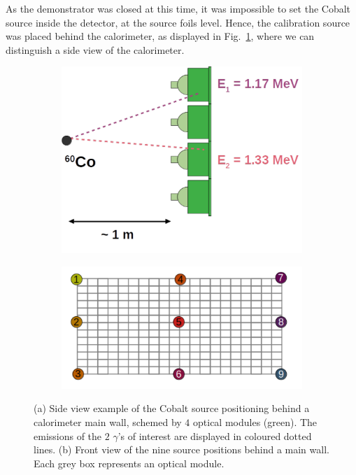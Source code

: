 As the demonstrator was closed at this time, it was impossible to set the Cobalt source inside the detector, at the source foils level.
Hence, the calibration source was placed behind the calorimeter, as displayed in Fig.~\ref{subfig:Co_setup}, where we can distinguish a side view of the calorimeter.
\begin{figure}[h]
  \centering
  \begin{subfigure}[t]{0.48\textwidth}
    \centering
    \includegraphics[height=0.5\textwidth]{commissioning/fig_commissioning/Co_setup.pdf}
    \captionsetup{justification=justified}
    \caption{
      \label{subfig:Co_setup}}
  \end{subfigure}
  \hfill
  \begin{subfigure}[t]{0.48\textwidth}
    \centering
    \includegraphics[height=0.5\textwidth]{commissioning/fig_commissioning/Co_setup_wall.pdf}
    \captionsetup{justification=justified}
    \caption{
      \label{subfig:Co_setup_wall}}
  \end{subfigure}
  \caption{(a) Side view example of the Cobalt source positioning behind a calorimeter main wall, schemed by $4$ optical modules (green).
    The emissions of the $2$ $\gamma$'s of interest are displayed in coloured dotted lines.
    (b) Front view of the nine source positions behind a main wall.
    Each grey box represents an optical module.
  }
\end{figure}

